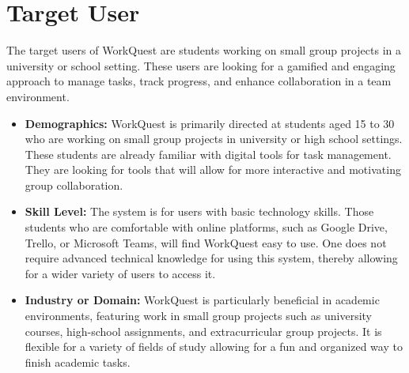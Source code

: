 \section{Target User}  
\label{section:target-user}  

The target users of WorkQuest are students working on small group projects in a university or school setting. These users are looking for a gamified and engaging approach to manage tasks, track progress, and enhance collaboration in a team environment.

\begin{itemize}  
    \item \textbf{Demographics:} WorkQuest is primarily directed at students aged 15 to 30 who are working on small group projects in university or high school settings. These students are already familiar with digital tools for task management. They are looking for tools that will allow for more interactive and motivating group collaboration. 
      
    \item \textbf{Skill Level:} The system is for users with basic technology skills. Those students who are comfortable with online platforms, such as Google Drive, Trello, or Microsoft Teams, will find WorkQuest easy to use. One does not require advanced technical knowledge for using this system, thereby allowing for a wider variety of users to access it. 
      
    \item \textbf{Industry or Domain:} WorkQuest is particularly beneficial in academic environments, featuring work in small group projects such as university courses, high-school assignments, and extracurricular group projects. It is flexible for a variety of fields of study allowing for a fun and organized way to finish academic tasks. 
\end{itemize}

